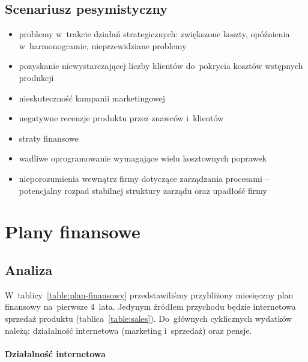 \documentclass[12pt]{article}
\begin{document}
\subsection{Scenariusz pesymistyczny}

\begin{itemize}
    \item problemy w~trakcie działań strategicznych: zwiększone koszty, opóźnienia w~harmonogramie, nieprzewidziane problemy
    \item pozyskanie niewystarczającej liczby klientów do~pokrycia kosztów wstępnych produkcji
    \item nieskuteczność kampanii marketingowej
    \item negatywne recenzje produktu przez znawców i~klientów
    \item straty finansowe
    \item wadliwe oprogramowanie wymagające wielu kosztownych poprawek
    \item nieporozumienia wewnątrz firmy dotyczące zarządzania procesami -- potencjalny rozpad stabilnej struktury zarządu oraz upadłość firmy
\end{itemize}

\section{Plany finansowe}



\subsection{Analiza}

W~tablicy~\ref{table:plan-finansowy} przedstawiliśmy przybliżony miesięczny plan finansowy na~pierwsze 4~lata.
Jedynym źródłem przychodu będzie internetowa sprzedaż produktu (tablica~\ref{table:sales}).
Do~głównych cyklicznych wydatków należą: działalność internetowa (marketing i~sprzedaż) oraz pensje.

\paragraph{Działalność internetowa}
\end{document}
